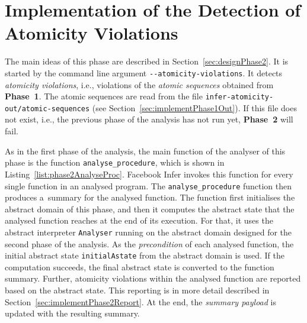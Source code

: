 \begin{algorithm}[hbt]



    \caption{%
        Printing atomic sequences from the summaries of all analysed
        functions
    }
    \label{alg:printAtomSeq}
\end{algorithm}


\section{Implementation of the Detection of Atomicity Violations}
\label{sec:implementPhase2}

The main ideas of this phase are described in Section~\ref{sec:designPhase2}.
It is started by the command line argument \texttt{{-}{-}atomicity-violations}.
It detects \emph{atomicity violations}, i.e., violations of the \emph{atomic
sequences} obtained from \textbf{Phase~1}. The atomic sequences are read from
the file \texttt{infer-atomicity-out/atomic-sequences} (see
Section~\ref{sec:implementPhase1Out}). If this file does not exist,
i.e., the previous phase of the analysis has not run yet, \textbf{Phase~2}
will fail.

As in the first phase of the analysis, the main function of the analyser
of this phase is the function \texttt{analyse\_procedure}, which is shown
in Listing~\ref{list:phase2AnalyseProc}. Facebook Infer invokes this
function for every single function in an analysed program. The
\texttt{analyse\_procedure} function then produces a~summary for the
analysed function. The function first initialises the abstract domain of
this phase, and then it computes the abstract state that the analysed
function reaches at the end of its execution. For that, it uses the
abstract interpreter \texttt{Analyser} running on the abstract domain
designed for the second phase of the analysis. As the \emph{precondition}
of each analysed function, the initial abstract state \texttt{initialAstate}
from the abstract domain is used. If the computation succeeds, the final
abstract state is converted to the function summary. Further, atomicity
violations within the analysed function are reported based on the abstract
state. This reporting is in more detail described in
Section~\ref{sec:implementPhase2Report}. At the end, the \emph{summary
payload} is updated with the resulting summary.

